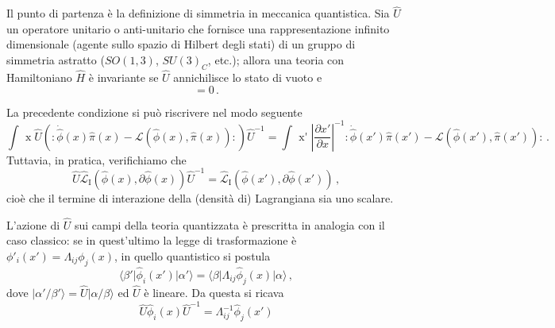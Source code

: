 \documentclass{article}
\begin{document}
Il punto di partenza è la definizione di simmetria in meccanica quantistica. Sia $\hat{U}$ un operatore unitario o anti-unitario che fornisce una rappresentazione infinito dimensionale (agente sullo spazio di Hilbert degli stati) di un gruppo di simmetria astratto ($SO(1,3)$, $SU(3)_C$, etc.); allora una teoria con Hamiltoniano $\hat{H}$ è invariante se $\hat{U}$ annichilisce lo stato di vuoto e
\begin{equation}
  [\hat{U},\hat{H}] = 0 \, .
\end{equation}

La precedente condizione si può riscrivere nel modo seguente
\begin{equation}
  \int \! \mathop{d^3 \! x} \hat{U} \left( : \! \dot{\hat{\phi}}(x) \hat{\pi}(x) - \mathcal{L}(\hat{\phi}(x), \hat{\pi}(x)) \! : \right) \hat{U}^{-1}  = \int \! \mathop{d^3 \! x'} \left\vert \frac{\partial x'}{\partial x} \right\vert^{-1} : \! \dot{\hat{\phi}}(x') \hat{\pi}(x') - \mathcal{L}(\hat{\phi}(x'), \hat{\pi}(x')) \! : \, .
\end{equation}
Tuttavia, in pratica, verifichiamo che
\begin{equation}
  \hat{U} \hat{\mathcal{L}}_\text{I}(\hat{\phi}(x),\partial \hat{\phi}(x)) \hat{U}^{-1} = \hat{\mathcal{L}}_\text{I}(\hat{\phi}(x'),\partial \hat{\phi}(x')) \, ,
\end{equation}
cioè che il termine di interazione della (densità di) Lagrangiana sia uno scalare.

L'azione di $\hat{U}$ sui campi della teoria quantizzata è prescritta in analogia con il caso classico: se in quest'ultimo la legge di trasformazione è $\phi'_i (x') = \Lambda_{i j} \phi_j (x)$, in quello quantistico si postula
\begin{equation}
  \langle \beta' \vert \hat{\phi}_i (x') \vert \alpha' \rangle = \langle \beta \vert \Lambda_{i j} \hat{\phi}_j (x) \vert \alpha \rangle \, ,
  \label{eq:quantum_transformation_rule}
\end{equation}
dove $\vert \alpha'/\beta' \rangle = \hat{U} \vert \alpha/\beta \rangle$ ed $\hat{U}$ è lineare. Da questa si ricava
\begin{equation}
  \hat{U} \hat{\phi}_i (x) \hat{U}^{-1} = \Lambda^{-1}_{i j} \hat{\phi}_j(x')
\end{equation}
\end{document}
